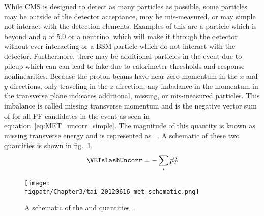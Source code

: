 While CMS is designed to detect as many particles as possible, some particles may be outside of the detector acceptance, may be mis-measured, or may simple not interact with the detection elements.
Examples of this are a particle which is beyond and $\eta$ of 5.0 or a neutrino, which will make it through the detector without ever interacting or a BSM particle which do not interact with the detector.
Furthermore, there may be additional particles in the event due to pileup which can can lead to fake \VETslash due to calorimeter thresholds and response nonlinearities.
Because the proton beams have near zero momentum in the $x$ and $y$ directions, only traveling in the $z$ direction, any imbalance in the momentum in the transverse plane indicates additional, missing, or mis-measured particles.
This imbalance is called missing transverse momentum and is the negative vector sum of \ptvec for all PF candidates in the event as seen in equation~\ref{eq:MET_uncorr_simple}.
The magnitude of this quantity is known as missing transverse energy and is represented as \ETslash~\cite{METperf2012}. A schematic of these two quantities is shown in fig.~\ref{fig:MET_schematic}.
\begin{equation}
\label{eq:MET_uncorr_simple}
\VETslashUncorr=-\sum_{i}{\vec{p}_{T}}^{\text{ }i}
\end{equation}

\begin{figure}[!hbt]
    \vspace*{-0.5cm}
    \centering
    \texttt{[image: \\figpath/Chapter3/tai\_20120616\_met\_schematic.png]}
    \caption{A schematic of the \VETslash and \ETslash quantities~\cite{METAnalysis}.}
    \label{fig:MET_schematic}
\end{figure}


